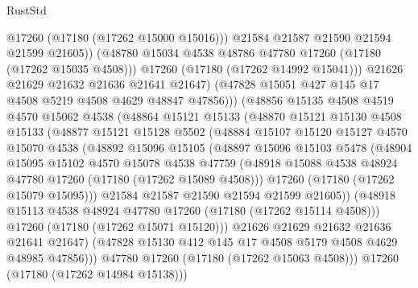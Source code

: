\begin{lexlean}{RustStd}
\begin{coremodule}
{\begin{coremodule}
{{{{{{{{{{{{{{{{{{{{{{{{{{{{{{{{{{{{{{{{{{{{{{{{{{{{{{{                        @17260
                        (@17180 (@17262 @15000 @15016)))
                      @21584
                      @21587
                      @21590
                      @21594
                      @21599
                      @21605))
                  (@48780 @15034 @4538 @48786 @47780 @17260 (@17180 (@17262 @15035 @4508)))
                  @17260
                  (@17180 (@17262 @14992 @15041)))
                @21626
                @21629
                @21632
                @21636
                @21641
                @21647)
              (@47828 @15051 @427 @145 @17 @4508 @5219 @4508 @4629 @48847 @47856)))
          (@48856
            @15135
            @4508
            @4519
            @4570
            @15062
            @4538
            (@48864
              @15121
              @15133
              (@48870
                @15121
                @15130
                @4508
                @15133
                (@48877
                  @15121
                  @15128
                  @5502
                  (@48884
                    @15107
                    @15120
                    @15127
                    @4570
                    @15070
                    @4538
                    (@48892
                      @15096
                      @15105
                      (@48897
                        @15096
                        @15103
                        @5478
                        (@48904
                          @15095
                          @15102
                          @4570
                          @15078
                          @4538
                          @47759
                          (@48918 @15088 @4538 @48924 @47780 @17260 (@17180 (@17262 @15089 @4508)))
                          @17260
                          (@17180 (@17262 @15079 @15095)))
                        @21584
                        @21587
                        @21590
                        @21594
                        @21599
                        @21605))
                    (@48918 @15113 @4538 @48924 @47780 @17260 (@17180 (@17262 @15114 @4508)))
                    @17260
                    (@17180 (@17262 @15071 @15120)))
                  @21626
                  @21629
                  @21632
                  @21636
                  @21641
                  @21647)
                (@47828 @15130 @412 @145 @17 @4508 @5179 @4508 @4629 @48985 @47856)))
            @47780
            @17260
            (@17180 (@17262 @15063 @4508)))
          @17260
          (@17180 (@17262 @14984 @15138)))
}}}}}}}}}}}}}}}}}}}}}}}}}}}}}}}}}}}}}}}}}}}}}}}}}}}}}}}
\end{coremodule}}
\end{coremodule}
\end{lexlean}
